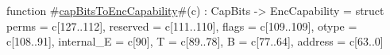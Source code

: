 function #\hyperref[sailRISCVzcapBitsToEncCapability]{capBitsToEncCapability}#(c) : CapBits -> EncCapability = struct {
  perms      = c[127..112],
  reserved   = c[111..110],
  flags      = c[109..109],
  otype      = c[108..91],
  internal_E = c[90],
  T          = c[89..78],
  B          = c[77..64],
  address    = c[63..0]
}
